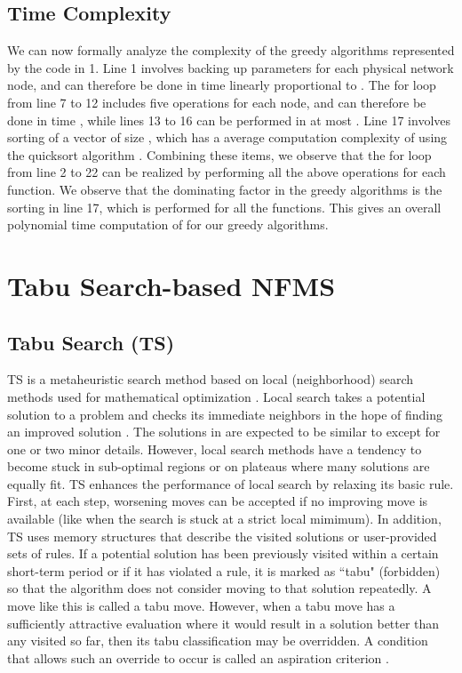 \documentclass[conference]{IEEEtran}
\begin{document}
\subsection{Time Complexity}\label{tc1}
We can now formally analyze the complexity of the greedy algorithms represented by the code in 1. Line 1 involves backing up parameters for each physical network node, and can therefore be done in time linearly proportional to . The for loop from line 7 to 12 includes five operations for each node, and can therefore be done in time , while lines 13 to 16 can be performed in at most . Line 17 involves sorting of a vector of size , which has a average computation complexity of  using the quicksort algorithm \cite{Alsuwaiyel98}. Combining these items, we observe that the for loop from line 2 to 22 can be realized by performing all the above operations for each function. We observe that the dominating factor in the greedy algorithms is the sorting in line 17, which is performed for all the functions. This gives an overall polynomial time computation of  for our greedy algorithms.


\section{Tabu Search-based NFMS}\label{tabu}
\subsection{Tabu Search (TS)}
TS is a metaheuristic search method based on local (neighborhood) search methods used for mathematical optimization \cite{Glover1986533}. Local search \cite{MichielsLS} takes a potential solution  to a problem and checks its immediate neighbors  in the hope of finding an improved solution . The solutions in  are expected to be similar to  except for one or two minor details. However, local search methods have a tendency to become stuck in sub-optimal regions or on plateaus where many solutions are equally fit. TS enhances the performance of local search by relaxing its basic rule. First, at each step, worsening moves can be accepted if no improving move is available (like when the search is stuck at a strict local mimimum). In addition, TS uses memory structures that describe the visited solutions or user-provided sets of rules. If a potential solution has been previously visited within a certain short-term period or if it has violated a rule, it is marked as ``tabu" (forbidden) so that the algorithm does not consider moving to that solution repeatedly. A move like this is called a tabu move. However, when a tabu move has a sufficiently attractive evaluation where it would result in a solution better than any visited so far, then its tabu classification may be overridden. A condition that allows such an override to occur is called an aspiration criterion \cite{GloverTS}.
\end{document}
